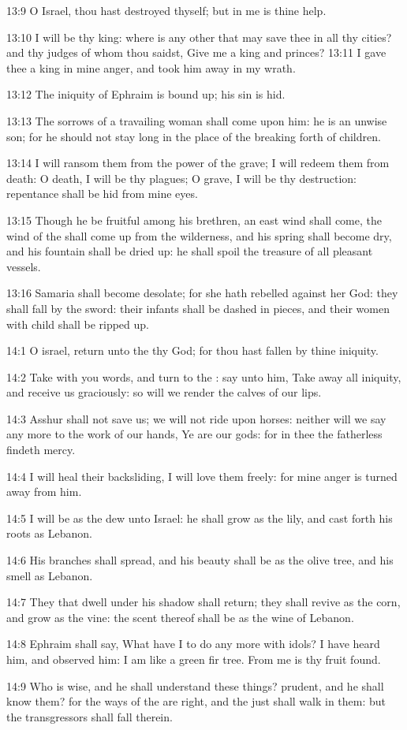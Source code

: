 13:9 O Israel, thou hast destroyed thyself; but in me is thine help.

13:10 I will be thy king: where is any other that may save thee in all
thy cities? and thy judges of whom thou saidst, Give me a king and
princes?  13:11 I gave thee a king in mine anger, and took him away in
my wrath.

13:12 The iniquity of Ephraim is bound up; his sin is hid.

13:13 The sorrows of a travailing woman shall come upon him: he is an
unwise son; for he should not stay long in the place of the breaking
forth of children.

13:14 I will ransom them from the power of the grave; I will redeem
them from death: O death, I will be thy plagues; O grave, I will be
thy destruction: repentance shall be hid from mine eyes.

13:15 Though he be fruitful among his brethren, an east wind shall
come, the wind of the \LORD shall come up from the wilderness, and his
spring shall become dry, and his fountain shall be dried up: he shall
spoil the treasure of all pleasant vessels.

13:16 Samaria shall become desolate; for she hath rebelled against her
God: they shall fall by the sword: their infants shall be dashed in
pieces, and their women with child shall be ripped up.

14:1 O israel, return unto the \LORD thy God; for thou hast fallen by
thine iniquity.

14:2 Take with you words, and turn to the \LORD: say unto him, Take
away all iniquity, and receive us graciously: so will we render the
calves of our lips.

14:3 Asshur shall not save us; we will not ride upon horses: neither
will we say any more to the work of our hands, Ye are our gods: for in
thee the fatherless findeth mercy.

14:4 I will heal their backsliding, I will love them freely: for mine
anger is turned away from him.

14:5 I will be as the dew unto Israel: he shall grow as the lily, and
cast forth his roots as Lebanon.

14:6 His branches shall spread, and his beauty shall be as the olive
tree, and his smell as Lebanon.

14:7 They that dwell under his shadow shall return; they shall revive
as the corn, and grow as the vine: the scent thereof shall be as the
wine of Lebanon.

14:8 Ephraim shall say, What have I to do any more with idols? I have
heard him, and observed him: I am like a green fir tree. From me is
thy fruit found.

14:9 Who is wise, and he shall understand these things? prudent, and
he shall know them? for the ways of the \LORD are right, and the just
shall walk in them: but the transgressors shall fall therein.

